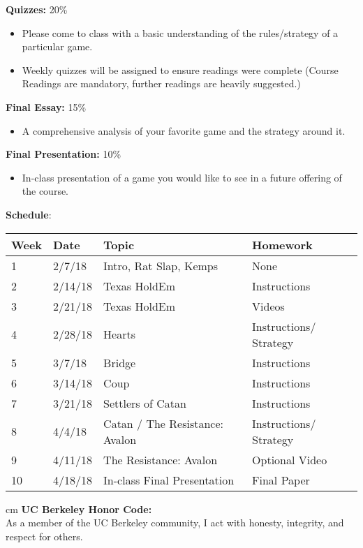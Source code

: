 \documentclass[11.5pt]{article}
\begin{document}
\begin{description}
\item \textbf{Quizzes:} 20\% 
\end{description}

\begin{itemize}
\item Please come to class with a basic understanding of the rules/strategy of a
particular game. 
\item Weekly quizzes will be assigned to ensure readings were complete (Course
Readings are mandatory, further readings are heavily suggested.)
\end{itemize}

\begin{description}
\item \textbf{Final Essay:} 15\% 
\end{description}

\begin{itemize}
\item A comprehensive analysis of your favorite game and the strategy around it.
\end{itemize}

\begin{description}
\item \textbf{Final Presentation:} 10\% 
\end{description}

\begin{itemize}
\item In-class presentation of a game you would like to see in a future offering of the course.
\end{itemize}
\newpage

\noindent\textbf{\large Schedule}: \vspace*{0.05cm}
\flushleft
\begin{tabular}{ |p{0.8cm}||p{3cm}|p{7cm}|p{4cm}|  }
 \hline
 Week & Date & Topic & Homework \\
 \hline
1  & 2/7/18 & Intro, Rat Slap, Kemps & None \\ \hline
2 &  2/14/18  & Texas HoldEm  & Instructions \\ \hline
3 & 2/21/18 & Texas HoldEm & Videos \\ \hline
4 & 2/28/18  & Hearts & Instructions/ Strategy\\ \hline
5 & 3/7/18 & Bridge &  Instructions \\ \hline
6 & 3/14/18 & Coup & Instructions \\ \hline
7 & 3/21/18 & Settlers of Catan & Instructions \\ \hline
8 & 4/4/18 & Catan / The Resistance: Avalon & Instructions/ Strategy \\ \hline
9 & 4/11/18 & The Resistance: Avalon & Optional Video \\ \hline
10 & 4/18/18 & In-class Final Presentation & Final Paper \\
\hline
\end{tabular}
 cm
\noindent\textbf{UC Berkeley Honor Code:} \\
As a member of the UC Berkeley community, I act with honesty, integrity, and respect for others.
\end{document}
